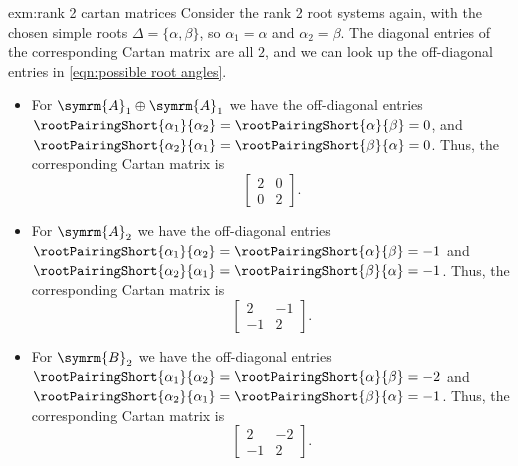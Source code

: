 \documentclass[fleqn]{NotesClass}
\newcommand{\dynkin}[2]{\symrm{#1}_{#2}}
\begin{document}
    \begin{exm}{}{exm:rank 2 cartan matrices}
        Consider the rank 2 root systems again, with the chosen simple roots \(\Delta = \{\alpha, \beta\}\), so \(\alpha_1 = \alpha\) and \(\alpha_2 = \beta\).
        The diagonal entries of the corresponding Cartan matrix are all \(2\), and we can look up the off-diagonal entries in \cref{eqn:possible root angles}.
        \begin{itemize}
            \item For \(\dynkin{A}{1} \oplus \dynkin{A}{1}\) we have the off-diagonal entries \(\rootPairingShort{\alpha_1}{\alpha_2} = \rootPairingShort{\alpha}{\beta} = 0\), and \(\rootPairingShort{\alpha_2}{\alpha_1} = \rootPairingShort{\beta}{\alpha} = 0\).
            Thus, the corresponding Cartan matrix is
            \begin{equation}
                \begin{bmatrix}
                    2 & 0\\
                    0 & 2
                \end{bmatrix}
                .
            \end{equation}
            \item For \(\dynkin{A}{2}\) we have the off-diagonal entries \(\rootPairingShort{\alpha_1}{\alpha_2} = \rootPairingShort{\alpha}{\beta} = -1\) and \(\rootPairingShort{\alpha_2}{\alpha_1} = \rootPairingShort{\beta}{\alpha} = -1\).
            Thus, the corresponding Cartan matrix is
            \begin{equation}
                \begin{bmatrix}
                    2 & -1\\
                    -1 & 2
                \end{bmatrix}
                .
            \end{equation}
            \item For \(\dynkin{B}{2}\) we have the off-diagonal entries \(\rootPairingShort{\alpha_1}{\alpha_2} = \rootPairingShort{\alpha}{\beta} = -2\) and \(\rootPairingShort{\alpha_2}{\alpha_1} = \rootPairingShort{\beta}{\alpha} = -1\).
            Thus, the corresponding Cartan matrix is
            \begin{equation}
                \begin{bmatrix}
                    2 & -2\\
                    -1 & 2
                \end{bmatrix}
                .

\end{equation}
\end{itemize}
\end{exm}
\end{document}
